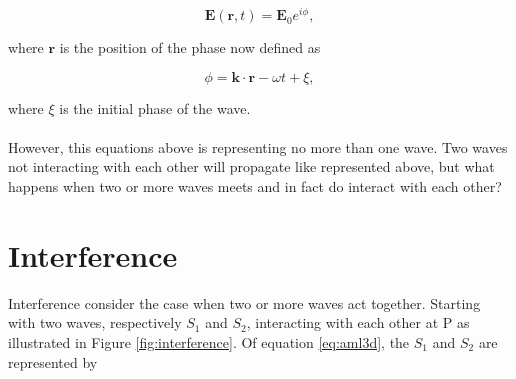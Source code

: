 \begin{equation}
    \textbf{E}(\textbf{r},t) = \textbf{E}_0 e^{i \phi},
    \label{eq:aml3d}
\end{equation}

where $\textbf{r}$ is the position of the phase now defined as 

\begin{equation}
    \phi = \textbf{k}\cdot \textbf{r} - \omega t + \xi,
    \label{eq:phase}
\end{equation}

where $\xi$ is the initial phase of the wave. 
\\\\
However, this equations above is representing no more than one wave. Two waves not interacting with each other will propagate like represented above, but what happens when two or more waves meets and in fact do interact with each other? 

\vspace{1.3cm}
\section{Interference}
Interference consider the case when two or more waves act together. Starting with two waves, respectively $S_1$ and $S_2$, interacting with each other at P as illustrated in Figure \ref{fig:interference}. Of equation \ref{eq:aml3d}, the $S_1$ and $S_2$ are represented by

